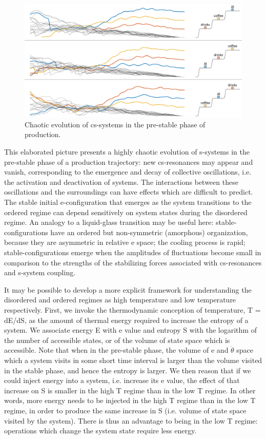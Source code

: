    
\begin{figure}
\includegraphics[width=\textwidth]{figures/Tilsen-img77.png}
\caption{Chaotic evolution of cs-systems in the pre-stable phase of production.}
\label{fig:4:27}
\end{figure}
 

  This elaborated picture presents a highly chaotic evolution of s-systems in the pre-stable phase of a production trajectory: new cs-resonances may appear and vanish, corresponding to the emergence and decay of collective oscillations, i.e. the activation and deactivation of systems. The interactions between these oscillations and the surroundings can have effects which are difficult to predict. The stable initial e-configuration that emerges as the system transitions to the ordered regime can depend sensitively on system states during the disordered regime. An analogy to a liquid-glass transition may be useful here: stable-configurations have an ordered but non-symmetric  (amorphous) organization, because they are asymmetric in relative e space; the cooling process is rapid; stable-configurations emerge when the amplitudes of fluctuations become small in comparison to the strengths of the stabilizing forces associated with cs-resonances and s-system coupling.

  It may be possible to develop a more explicit framework for understanding the disordered and ordered regimes as high temperature and low temperature respectively. First, we invoke the thermodynamic conception of temperature, T = dE/dS, as the amount of thermal energy required to increase the entropy of a system. We associate energy E with e value and entropy S with the logarithm of the number of accessible states, or of the volume of state space which is accessible. Note that when in the pre-stable phase, the volume of e and $\dot{\theta}$ space which a system visits in some short time interval is larger than the volume visited in the stable phase, and hence the entropy is larger. We then reason that if we could inject energy into a system, i.e. increase its e value, the effect of that increase on S is smaller in the high T regime than in the low T regime. In other words, more energy needs to be injected in the high T regime than in the low T regime, in order to produce the same increase in S (i.e. volume of state space visited by the system). There is thus an advantage to being in the low T regime: operations which change the system state require less energy.

